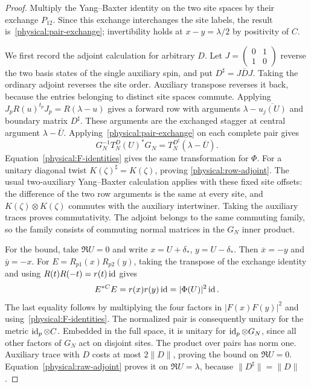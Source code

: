 \begin{proof}
Multiply the Yang--Baxter identity on the two site spaces by their
exchange $P_{12}$. Since this exchange interchanges the site labels, the
result is~\eqref{physical:pair-exchange}; invertibility holds at
$x-y=\lambda/2$ by positivity of $C$.

We first record the adjoint calculation for arbitrary $D$. Let
$J=\left(\begin{smallmatrix}0&1\\1&0\end{smallmatrix}\right)$
reverse the two basis states of the single auxiliary spin, and put
$D^\sharp=J\overline D J$.
Taking the ordinary adjoint reverses the site order. Auxiliary transpose
reverses it back, because the entries belonging to distinct site spaces
commute. Applying
$J_pR(u)^{t_p}J_p=R(\lambda-u)$ gives a forward row with arguments
$\lambda-\overline{u_j(U)}$ and boundary matrix $D^\sharp$.
These arguments are the exchanged stagger at central argument
$\lambda-\overline U$. Applying~\eqref{physical:pair-exchange} on each
complete pair gives
\begin{equation}\label{physical:raw-adjoint}
 G_N^{-1}T_N^D(U)^*G_N
       =T_N^{D^\sharp}(\lambda-\overline U).
\end{equation}
Equation~\eqref{physical:F-identities} gives the same transformation for
$\Phi$. For a unitary diagonal twist $K(\zeta)^\sharp=K(\zeta)$, proving
\eqref{physical:row-adjoint}. The usual two-auxiliary Yang--Baxter
calculation applies with these fixed site offsets: the difference of the
two row arguments is the same at every site, and
$K(\zeta)\otimes K(\zeta)$ commutes with the auxiliary intertwiner.
Taking the auxiliary traces proves commutativity. The adjoint belongs to
the same commuting family, so the family consists of commuting normal
matrices in the $G_N$ inner product.

For the bound, take $\Re U=0$ and write $x=U+\delta_*$, $y=U-\delta_*$.
Then $\overline x=-y$ and $\overline y=-x$. For
$E=R_{p1}(x)R_{p2}(y)$, taking the transpose of the exchange identity
and using $R(t)R(-t)=r(t)\operatorname{id}$ gives
\begin{equation}\label{physical:unfused-boundary-unitarity}
 E^{*C}E=r(x)r(y)\operatorname{id}=|\Phi(U)|^2\operatorname{id}.
\end{equation}
The last equality follows by multiplying the four factors in
$|F(x)F(y)|^2$ and using~\eqref{physical:F-identities}.
The normalized pair is consequently unitary for the metric
$\operatorname{id}_p\otimes C$. Embedded in the full space, it is unitary for
$\operatorname{id}_p\otimes G_N$, since all other factors of $G_N$ act on disjoint sites.
The product over pairs has norm one. Auxiliary trace with $D$ costs at
most $2\|D\|$, proving the bound on $\Re U=0$.
Equation~\eqref{physical:raw-adjoint} proves it on $\Re U=\lambda$, because
$\|D^\sharp\|=\|D\|$.


\end{proof}
